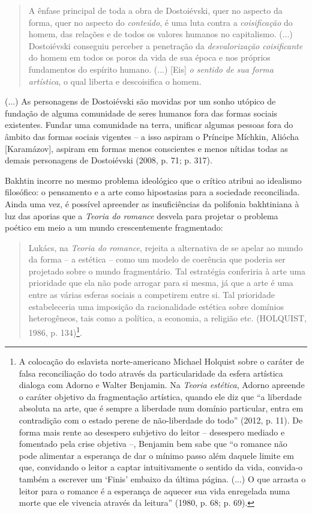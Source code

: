 \begin{quote}
A ênfase principal de toda a obra de Dostoiévski, quer no aspecto da
forma, quer no aspecto do \emph{conteúdo}, é uma luta contra a
\emph{coisificação} do homem, das relações e de todos os valores humanos
no capitalismo. (...) Dostoiévski conseguiu perceber a penetração da
\emph{desvalorização coisificante} do homem em todos os poros da vida de
sua época e nos próprios fundamentos do espírito humano. (...) {[}Eis{]}
\emph{o sentido de sua forma artística}, o qual liberta e descoisifica o
homem.
\end{quote}

(...) As personagens de Dostoiévski são movidas por um sonho utópico de
fundação de alguma comunidade de seres humanos fora das formas sociais
existentes. Fundar uma comunidade na terra, unificar algumas pessoas
fora do âmbito das formas sociais vigentes -- a isso aspiram o Príncipe
Míchkin, Aliócha {[}Karamázov{]}, aspiram em formas menos conscientes e
menos nítidas todas as demais personagens de Dostoiévski (2008, p. 71;
p. 317).

Bakhtin incorre no mesmo problema ideológico que o crítico atribui ao
idealismo filosófico: o pensamento e a arte como hipostasias para a
sociedade reconciliada. Ainda uma vez, é possível apreender as
insuficiências da polifonia bakhtiniana à luz das aporias que a
\emph{Teoria do romance} desvela para projetar o problema poético em
meio a um mundo crescentemente fragmentado:

\begin{quote}
Lukács, na \emph{Teoria do romance}, rejeita a alternativa de se apelar
ao mundo da forma -- a estética -- como um modelo de coerência que
poderia ser projetado sobre o mundo fragmentário. Tal estratégia
conferiria à arte uma prioridade que ela não pode arrogar para si mesma,
já que a arte é uma entre as várias esferas sociais a competirem entre
si. Tal prioridade estabeleceria uma imposição da racionalidade estética
sobre domínios heterogêneos, tais como a política, a economia, a
religião etc. (HOLQUIST, 1986, p. 134)\footnote{A colocação do eslavista
  norte-americano Michael Holquist sobre o caráter de falsa
  reconciliação do todo através da particularidade da esfera artística
  dialoga com Adorno e Walter Benjamin. Na \emph{Teoria estética},
  Adorno apreende o caráter objetivo da fragmentação artística, quando
  ele diz que ``a liberdade absoluta na arte, que é sempre a liberdade
  num domínio particular, entra em contradição com o estado perene de
  não-liberdade do todo'' (2012, p. 11). De forma mais rente ao
  desespero subjetivo do leitor -- desespero mediado e fomentado pela
  crise objetiva --, Benjamin bem sabe que ``o romance não pode
  alimentar a esperança de dar o mínimo passo além daquele limite em
  que, convidando o leitor a captar intuitivamente o sentido da vida,
  convida-o também a escrever um `Finis' embaixo da última página. (...)
  O que arrasta o leitor para o romance é a esperança de aquecer sua
  vida enregelada numa morte que ele vivencia através da leitura''
  (1980, p. 68; p. 69).}.
\end{quote}

